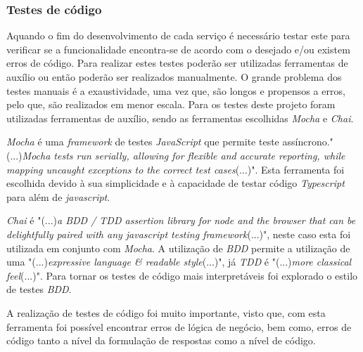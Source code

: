 \subsubsection{Testes de código}
Aquando o fim do desenvolvimento de cada serviço é necessário testar este para verificar se a funcionalidade encontra-se de acordo com o desejado e/ou existem erros de código. Para realizar estes testes poderão ser utilizadas ferramentas de auxílio ou então poderão ser realizados manualmente. O grande problema dos testes manuais é a exaustividade, uma vez que, são longos e propensos a erros, pelo que, são realizados em menor escala. Para os testes deste projeto foram utilizadas ferramentas de auxílio, sendo as ferramentas escolhidas \textit{Mocha} e \textit{Chai}.

\newpage

\textit{Mocha} é uma \textit{framework} de testes \textit{JavaScript} que permite teste assíncrono."(...)\emph{Mocha tests run serially, allowing for flexible and accurate reporting, while mapping uncaught exceptions to the correct test cases}(...)"\citep{mocha}. Esta ferramenta foi escolhida devido à sua simplicidade e à capacidade de testar código \textit{Typescript} para além de \textit{javascript}.

\textit{Chai} é "(...)\emph{a BDD / TDD assertion library for node and the browser that can be delightfully paired with any javascript testing framework}(...)"\citep{chai}, neste caso esta foi utilizada em conjunto com \emph{Mocha}. A utilização de \emph{BDD} permite a utilização de uma "(...)\emph{expressive language \& readable style}(...)"\citep{chai}, já \emph{TDD} é "(...)\emph{more classical feel}(...)"\citep{chai}. Para tornar os testes de código mais interpretáveis foi explorado o estilo de testes \emph{BDD}.

A realização de testes de código foi muito importante, visto que, com esta ferramenta foi possível encontrar erros de lógica de negócio, bem como, erros de código tanto a nível da formulação de respostas como a nível de código.



